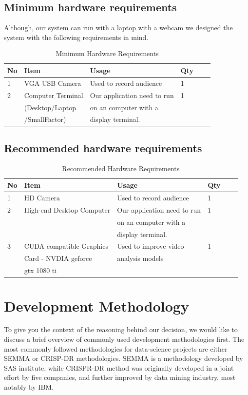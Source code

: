 \documentclass[12pt,a4paper,man]{report}
\begin{document}
\section{Minimum hardware requirements}
\label{sec:org127f046}
Although, our system can run with a laptop with a webcam we designed the system with the following requirements in mind.

\begin{table}[htbp]
\caption{\label{table:mreq}
Minimum Hardware Requirements}
\centering
\begin{tabular}{|l|l|l|l|lp{3cm}|}
\hline
No & Item & Usage & Qty\\
\hline
1 & VGA USB Camera & Used to record audience & 1\\
\hline
2 & Computer Terminal & Our application need to run & 1\\
 & (Desktop/Laptop & on an computer with a & \\
 & /SmallFactor) & display terminal. & \\
\hline
\end{tabular}
\end{table}

\section{Recommended hardware requirements}
\label{sec:org3c8f515}

\begin{table}[htbp]
\caption{\label{table:mxreq}
Recommended Hardware Requirements}
\centering
\begin{tabular}{|l|l|l|l|lp{3cm}|}
\hline
No & Item & Usage & Qty\\
\hline
1 & HD Camera & Used to record audience & 1\\
2 & High-end Desktop Computer & Our application need to run & 1\\
 &  & on an computer with a & \\
 &  & display terminal. & \\
3 & CUDA compatible Graphics & Used to improve video & 1\\
 & Card - NVDIA geforce & analysis models & \\
 & gtx 1080 ti &  & \\
\hline
\end{tabular}
\end{table}

\chapter{Development Methodology}
\label{sec:org8c9e121}
To give you the context of the reasoning behind our decision, we would like to discuss a brief overview of commonly used development methodologies first. The most commonly followed methodologies for data-science projects are either SEMMA or CRISP-DR methodologies. SEMMA is a methodology developed by SAS institute, while CRISPR-DR method was originally developed in a joint effort by five companies, and further improved by data mining industry, most notably by IBM. 
\end{document}

